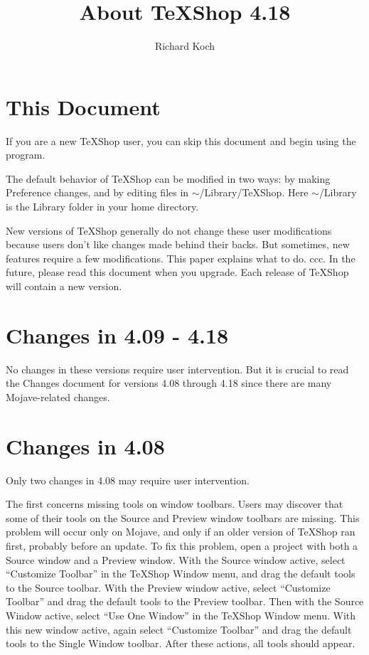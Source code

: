 \documentclass[11pt, oneside]{amsart}
\title{About TeXShop 4.18}
\author{Richard Koch}
\begin{document}
\maketitle

\thispagestyle{empty}
\vspace{-.3in}
\section{This Document}

If you are a new TeXShop user, you can skip this document and begin using the program.

The default behavior of TeXShop can be modified in two ways: by making Preference changes, and by editing files in $\sim$/Library/TeXShop. Here $\sim$/Library is the Library folder in your home directory. 

New versions of TeXShop generally do not change these user modifications because users don't like changes made behind their backs. But sometimes, new features require a few modifications. This paper explains what to do.
ccc.
In the future, please read this document when you upgrade. Each release of TeXShop will contain a new version.

\section{Changes in 4.09 - 4.18}

No changes in these versions require user intervention. But it is crucial to read the Changes document for versions 4.08 through 4.18 since there are many Mojave-related changes.

\section{Changes in 4.08}

Only two changes in 4.08 may require user intervention.

The first concerns missing tools on window toolbars. Users may discover that some of their tools on the Source and Preview window toolbars are missing. This problem will occur only on Mojave, and only if an older version of TeXShop ran first, probably before an update. To fix this problem, open a project with both a Source window and a Preview window. With the Source window active, select ``Customize Toolbar'' in the TeXShop Window menu, and drag the default tools to the Source toolbar. With the Preview window active, select ``Customize Toolbar'' and drag the default tools to the Preview toolbar. Then with the Source Window active, select ``Use One Window'' in the TeXShop Window menu. With this new window active, again select ``Customize Toolbar'' and drag the default tools to the Single Window toolbar. After these actions, all tools should appear.
\end{document}
